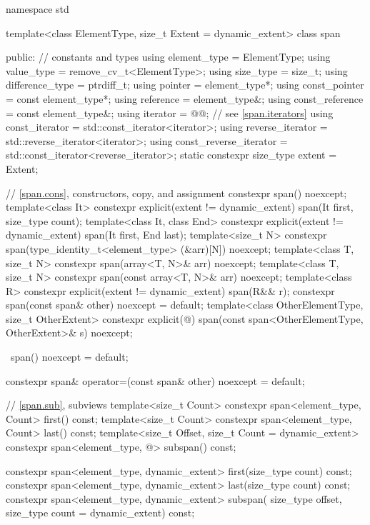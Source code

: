 %
\begin{codeblock}
namespace std {
  template<class ElementType, size_t Extent = dynamic_extent>
  class span {
  public:
    // constants and types
    using element_type = ElementType;
    using value_type = remove_cv_t<ElementType>;
    using size_type = size_t;
    using difference_type = ptrdiff_t;
    using pointer = element_type*;
    using const_pointer = const element_type*;
    using reference = element_type&;
    using const_reference = const element_type&;
    using iterator = @@;        // see \ref{span.iterators}
    using const_iterator = std::const_iterator<iterator>;
    using reverse_iterator = std::reverse_iterator<iterator>;
    using const_reverse_iterator = std::const_iterator<reverse_iterator>;
    static constexpr size_type extent = Extent;

    // \ref{span.cons}, constructors, copy, and assignment
    constexpr span() noexcept;
    template<class It>
      constexpr explicit(extent != dynamic_extent) span(It first, size_type count);
    template<class It, class End>
      constexpr explicit(extent != dynamic_extent) span(It first, End last);
    template<size_t N>
      constexpr span(type_identity_t<element_type> (&arr)[N]) noexcept;
    template<class T, size_t N>
      constexpr span(array<T, N>& arr) noexcept;
    template<class T, size_t N>
      constexpr span(const array<T, N>& arr) noexcept;
    template<class R>
      constexpr explicit(extent != dynamic_extent) span(R&& r);
    constexpr span(const span& other) noexcept = default;
    template<class OtherElementType, size_t OtherExtent>
      constexpr explicit(@\seebelow@) span(const span<OtherElementType, OtherExtent>& s) noexcept;

    ~span() noexcept = default;

    constexpr span& operator=(const span& other) noexcept = default;

    // \ref{span.sub}, subviews
    template<size_t Count>
      constexpr span<element_type, Count> first() const;
    template<size_t Count>
      constexpr span<element_type, Count> last() const;
    template<size_t Offset, size_t Count = dynamic_extent>
      constexpr span<element_type, @\seebelow@> subspan() const;

    constexpr span<element_type, dynamic_extent> first(size_type count) const;
    constexpr span<element_type, dynamic_extent> last(size_type count) const;
    constexpr span<element_type, dynamic_extent> subspan(
      size_type offset, size_type count = dynamic_extent) const;

}}
\end{codeblock}
